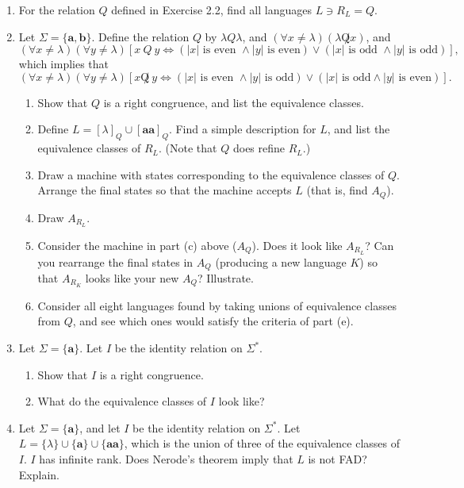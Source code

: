 \begin{enumerate}[{2.}1.]
\item For the relation $Q$ defined in Exercise 2.2, find all languages $L \ni
R_L = Q$.

\item Let $\Sigma=\{\pmb{a},\pmb{b}\}$. Define the relation $Q$ by $\lambda Q
\lambda$, and $(\forall x \not= \lambda)(\lambda \not   Q x)$, and
\[ (\forall x \not= \lambda)(\forall y \not= \lambda )[x\ Q\ y \Leftrightarrow
	(|x|\text{ is even }\wedge |y|\text{ is even})\vee(|x|\text{ is odd }
	\wedge |y|\text{ is odd})], \]
which implies that
\[ (\forall x \not= \lambda)(\forall y \not= \lambda)[x \not   Q\ y
	\Leftrightarrow (|x|\text{ is even }\wedge |y|\text{ is odd})\vee(|x|
	\text{ is odd} \wedge |y|\text{ is even})]. \]
\begin{enumerate}
\item Show that $Q$ is a right congruence, and list the equivalence classes.
\item Define $L=[\lambda]_Q \cup [\pmb{aa}]_Q$. Find a simple description for
$L$, and list the equivalence classes of $R_L$. (Note that $Q$ does refine
$R_L$.)
\item Draw a machine with states corresponding to the equivalence classes of
$Q$. Arrange the final states so that the machine accepts $L$ (that is, find
$A_Q$).
\item Draw $A_{R_L}$.
\item Consider the machine in part (c) above ($A_Q$). Does it look like
$A_{R_L}$? Can you rearrange the final states in $A_Q$ (producing a new language
$K$) so that $A_{R_K}$ looks like your new $A_Q$? Illustrate.
\item Consider all eight languages found by taking unions of equivalence classes
from $Q$, and see which ones would satisfy the criteria of part (e).
\end{enumerate}

\item Let $\Sigma=\{\pmb{a}\}$. Let $I$ be the identity relation on $\Sigma^*$.
\begin{enumerate}
\item Show that $I$ is a right congruence.
\item What do the equivalence classes of $I$ look like?
\end{enumerate}

\item Let $\Sigma=\{\pmb{a}\}$, and let $I$ be the identity relation on
$\Sigma^*$. Let $L=\{\lambda\} \cup \{\pmb{a}\} \cup \{\pmb{aa}\}$, which is
the union of three of the equivalence classes of $I$. $I$ has infinite rank.
Does Nerode's theorem imply that $L$ is not FAD? Explain.


\end{enumerate}
